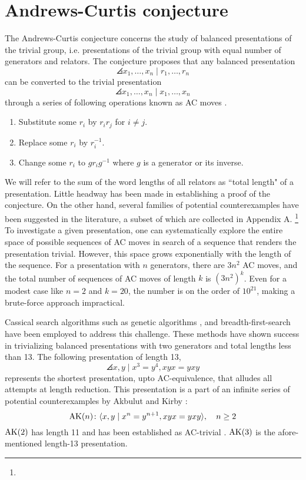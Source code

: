 
\section{Andrews-Curtis conjecture\label{sec:AC}}

The Andrews-Curtis conjecture concerns the study of balanced presentations of the trivial group, i.e. presentations of the trivial group with equal number of generators and relators. The conjecture proposes that any balanced presentation 
\[
\angles{x_1, \dots, x_n \mid r_1, \dots, r_n}
\]
can be converted to the trivial presentation
\[
\angles{x_1, \dots, x_n \mid x_1, \dots, x_n}
\]
through a series of following operations known as AC moves \cite{Andrews-Curtis}.
\begin{enumerate}
	\item Substitute some $r_i$ by $r_i r_j$ for $i \neq j$.
	\item Replace some $r_i$ by $r_i^{-1}$.
	\item Change some $r_i$ to $g r_i g^{-1}$ where $g$ is a generator or its inverse.
\end{enumerate}

We will refer to the sum of the word lengths of all relators as ``total length" of a presentation. Little headway has been made in establishing a proof of the conjecture. On the other hand, several families of potential counterexamples have been suggested in the literature, a subset of which are collected in Appendix A. \footnote{} To investigate a given presentation, one can systematically explore the entire space of possible sequences of AC moves in search of a sequence that renders the presentation trivial. However, this space grows exponentially with the length of the sequence. For a presentation with $n$ generators, there are $3n^2$ AC moves, and the total number of sequences of AC moves of length $k$ is $(3n^2)^k$. Even for a modest case like $n=2$ and $k=20$, the number is on the order of $10^{21}$, making a brute-force approach impractical.
\newline 

Cassical search algorithms such as genetic algorithms \cite{genetic}, and breadth-first-search  \cite{bfs-ac} have been employed to address this challenge. These methods have shown success in trivializing balanced presentations with two generators and total lengths less than 13. The following presentation of length 13,
\[
\angles{x, y \mid x^3 = y^4, xyx = yxy}
\]
represents the shortest presentation, upto AC-equivalence, that alludes all attempts at length reduction. This presentation is a part of an infinite series of potential counterexamples by Akbulut and Kirby \cite{Akbulut-Kirby}:
\[
\text{AK}(n) \colon \langle x, y \mid x^n = y^{n+1}, xyx = yxy\rangle, \quad n \geq 2
\]
$\text{AK}(2)$ has length 11 and has been established as AC-trivial  \cite{genetic}. $\text{AK}(3)$ is the afore-mentioned length-13 presentation. 
\newline

